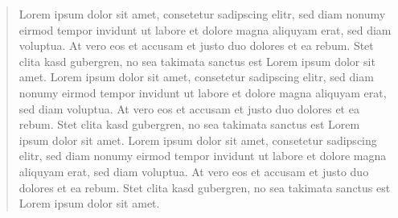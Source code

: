 \begin{quote}
Lorem ipsum dolor sit amet, consetetur sadipscing elitr, sed diam nonumy eirmod
tempor invidunt ut labore et dolore magna aliquyam erat, sed diam voluptua. At
vero eos et accusam et justo duo dolores et ea rebum. Stet clita kasd
gubergren, no sea takimata sanctus est Lorem ipsum dolor sit amet. Lorem ipsum
dolor sit amet, consetetur sadipscing elitr, sed diam nonumy eirmod tempor
invidunt ut labore et dolore magna aliquyam erat, sed diam voluptua. At vero
eos et accusam et justo duo dolores et ea rebum. Stet clita kasd gubergren, no
sea takimata sanctus est Lorem ipsum dolor sit amet. Lorem ipsum dolor sit
amet, consetetur sadipscing elitr, sed diam nonumy eirmod tempor invidunt ut
labore et dolore magna aliquyam erat, sed diam voluptua. At vero eos et accusam
et justo duo dolores et ea rebum. Stet clita kasd gubergren, no sea takimata
sanctus est Lorem ipsum dolor sit amet.
\end{quote}
